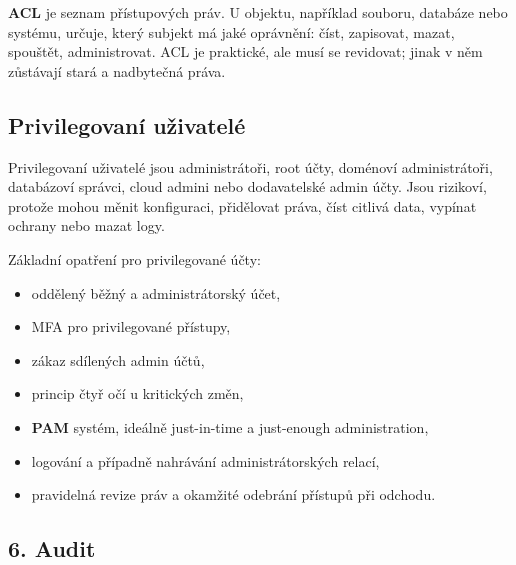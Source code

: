 \textbf{ACL} je seznam přístupových práv. U objektu, například souboru, databáze nebo systému, určuje, který subjekt má jaké oprávnění: číst, zapisovat, mazat, spouštět, administrovat. ACL je praktické, ale musí se revidovat; jinak v něm zůstávají stará a nadbytečná práva.


\subsection*{Privilegovaní uživatelé}

Privilegovaní uživatelé jsou administrátoři, root účty, doménoví administrátoři, databázoví správci, cloud admini nebo dodavatelské admin účty. Jsou rizikoví, protože mohou měnit konfiguraci, přidělovat práva, číst citlivá data, vypínat ochrany nebo mazat logy.

Základní opatření pro privilegované účty:
\begin{itemize}
    \item oddělený běžný a administrátorský účet,
    \item MFA pro privilegované přístupy,
    \item zákaz sdílených admin účtů,
    \item princip čtyř očí u kritických změn,
    \item \textbf{PAM} systém, ideálně just-in-time a just-enough administration,
    \item logování a případně nahrávání administrátorských relací,
    \item pravidelná revize práv a okamžité odebrání přístupů při odchodu.
\end{itemize}


\subsection*{6. Audit}

